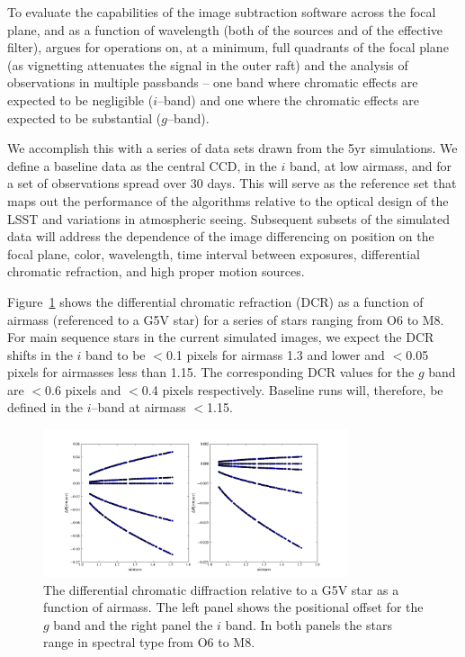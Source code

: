 \documentclass[12pt]{article}
\begin{document}
To evaluate the capabilities of the image subtraction software across
the focal plane, and as a function of wavelength (both of the sources
and of the effective filter), argues for operations on, at a minimum,
full quadrants of the focal plane (as vignetting attenuates the signal
in the outer raft) and the analysis of observations in multiple
passbands -- one band where chromatic effects are expected to be
negligible ($i$--band) and one where the chromatic effects are
expected to be substantial ($g$--band).

We accomplish this with a series of data sets drawn from the 5yr
simulations. We define a baseline data as the central CCD, in the $i$
band, at low airmass, and for a set of observations spread
over 30 days.  This will serve as the reference set that maps out the
performance of the algorithms relative to the optical design of the
LSST and variations in atmospheric seeing. Subsequent subsets of the
simulated data will address the dependence of the image differencing
on position on the focal plane, color, wavelength, time interval
between exposures, differential chromatic refraction, and high proper
motion sources. 

Figure~\ref{DCR} shows the differential chromatic refraction (DCR) as
a function of airmass (referenced to a G5V star) for a series of stars
ranging from O6 to M8. For main sequence stars in the current
simulated images, we expect the DCR shifts in the $i$ band to be
$<$0.1 pixels for airmass 1.3 and lower and $<$0.05 pixels for
airmasses less than 1.15. The corresponding DCR values for the $g$
band are $<$0.6 pixels and $<$0.4 pixels respectively. Baseline runs
will, therefore, be defined in the $i$--band at airmass $<$1.15.

\begin{figure}
\centerline{\includegraphics[width=0.8\textwidth]{Figures/DCR_R_stars.png}}
\caption{The differential chromatic diffraction relative to a G5V star
  as a function of airmass. The left panel shows the positional offset
  for the $g$ band and the right panel the $i$ band. In both panels
  the stars range in spectral type from O6 to M8.}
\label{DCR}
\end{figure}
\end{document}
